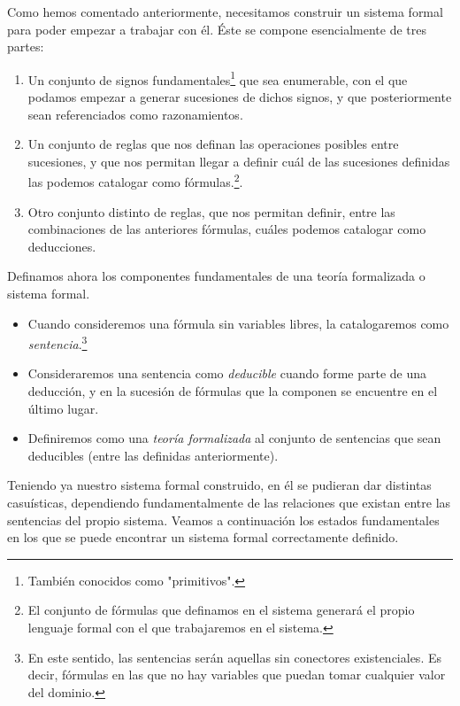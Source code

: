 Como hemos comentado anteriormente, necesitamos construir un sistema formal para poder empezar a trabajar con él. Éste se compone esencialmente de tres partes:
\begin{enumerate}
    \item Un conjunto de signos fundamentales\footnote{También conocidos como "primitivos".} que sea enumerable, con el que podamos empezar a generar sucesiones de dichos signos, y que posteriormente sean referenciados como razonamientos.
    \item Un conjunto de reglas que nos definan las operaciones posibles entre sucesiones, y que nos permitan llegar a definir cuál de las sucesiones definidas las podemos catalogar como fórmulas.\footnote{El conjunto de fórmulas
            que definamos en el sistema generará el propio lenguaje formal con el que trabajaremos en el sistema.}.
    \item Otro conjunto distinto de reglas, que nos permitan definir, entre las combinaciones de las anteriores fórmulas, cuáles podemos catalogar como deducciones.
\end{enumerate}

Definamos ahora los componentes fundamentales de una teoría formalizada o sistema formal. 
\begin{itemize}
    \item Cuando consideremos una fórmula sin variables libres, la catalogaremos como \textit{sentencia}.\footnote{En este sentido, las sentencias serán aquellas sin conectores existenciales. Es decir, fórmulas en las que no hay variables que puedan tomar
            cualquier valor del dominio.}
    \item Consideraremos una sentencia como \textit{deducible} cuando forme parte de una deducción, y en la sucesión de fórmulas que la componen se encuentre en el último lugar.
    \item Definiremos como una \textit{teoría formalizada} al conjunto de sentencias que sean deducibles (entre las definidas anteriormente).
\end{itemize}

Teniendo ya nuestro sistema formal construido, en él se pudieran dar distintas casuísticas, dependiendo fundamentalmente de las relaciones que existan entre las sentencias del propio sistema. Veamos a continuación los estados 
fundamentales en los que se puede encontrar un sistema formal correctamente definido. 

